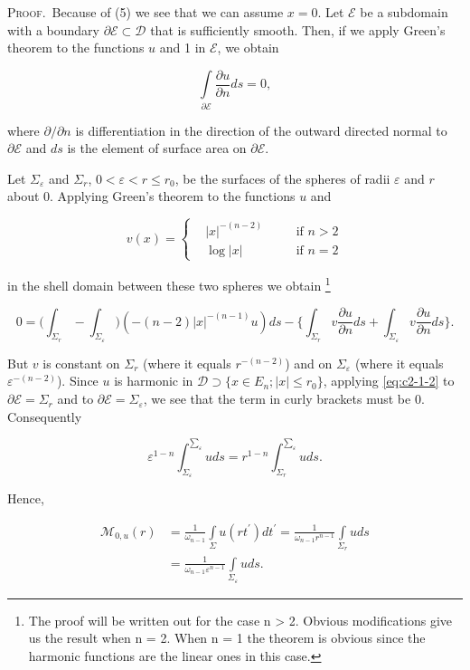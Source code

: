 \textsc{Proof.}\ Because of (5) we see that we can assume $x = 0$. Let $\mathcal{E}$ be a subdomain with a boundary $\partial\mathcal{E} \subset \mathcal{D}$ that is sufficiently smooth. Then, if we apply Green's theorem to the functions $u$ and 1 in $\mathcal{E}$, we obtain

\begin{equation}\label{eq:c2-1-2}
\int\limits_{\partial\mathcal{E}}\frac{\partial u}{\partial n}d s=0,
\end{equation}

where $\partial/\partial n$ is differentiation in the direction of the outward directed normal to $\partial\mathcal{E}$ and $ds$ is the element of surface area on $\partial\mathcal{E}$.

Let $\Sigma_\varepsilon$ and $\Sigma_r$, $0 < \varepsilon < r \leq r_0$, be the surfaces of the spheres of radii $\varepsilon$ and $r$ about 0. Applying Green's theorem to the functions $u$ and

\[
v(x)=\left\{\begin{aligned}&\left|x\right|^{-(n-2)}&\quad&\text{if } n>2\\ &\log\left|x\right|&\quad&\text{if } n=2\end{aligned}\right.
\]

in the shell domain between these two spheres we obtain \footnote{The proof will be written out for the case n > 2. Obvious modifications give us the result when n = 2. When n = 1 the theorem is obvious since the harmonic functions are the linear ones in this case.}

\[
0=\biggl(\int_{\Sigma_{r}}-\int_{\Sigma_{\varepsilon}}\biggr)(-(n-2)|x|^{-(n-1)}u) d s-\biggl\{\int_{\Sigma_{r}}v\frac{\partial u}{\partial n}d s+\int_{\Sigma_{\varepsilon}}v\frac{\partial u}{\partial n}d s\biggr\}.
\]

But $v$ is constant on $\Sigma_r$ (where it equals $r^{-(n-2)}$) and on $\Sigma_\varepsilon$ (where it equals $\varepsilon^{-(n-2)}$). Since $u$ is harmonic in $\mathcal{D} \supset \{x \in E_n; |x| \leq r_0\}$, applying \eqref{eq:c2-1-2} to $\partial \mathcal{E} = \Sigma_r$ and to $\partial \mathcal{E} = \Sigma_\varepsilon$, we see that the term in curly brackets must be 0. Consequently

\[
\varepsilon^{1-n}\int_{\Sigma_{\varepsilon}}^{\displaystyle\sum_{\varepsilon}}u d s = r^{1-n}\int_{\Sigma_{r}}^{\displaystyle\sum_{\varepsilon}}u d s.
\]

Hence,

\[
\begin{aligned}\mathcal{M}_{0,u}(r)&=\frac{1}{\omega_{n-1}}\int\limits_{\Sigma}u(rt^{\prime}) dt^{\prime}=\frac{1}{\omega_{n-1}r^{n-1}}\int\limits_{\Sigma_{r}}u ds\\&=\frac{1}{\omega_{n-1}\varepsilon^{n-1}}\int\limits_{\Sigma_{\varepsilon}}u ds.\end{aligned}
\]


